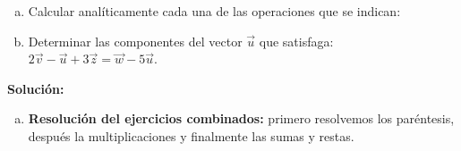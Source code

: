 \documentclass[11pt,a4paper]{article}
\begin{document}
\begin{enumerate}[\hspace{-5mm} 1) ]
    \begin{enumerate}[a)]
        \item Calcular analíticamente cada una de las operaciones que se indican:
            \begin{enumerate}[i)]
            \end{enumerate}
        \item Determinar las componentes del vector $\vec{u}$ que satisfaga: $2\vec{v} - \vec{u} + 3\vec{z} = \vec{w} - 5\vec{u}$.
    \end{enumerate} 

\bigskip

\textbf{Solución:}



\begin{enumerate}[a)]

\item \textbf{Resolución del ejercicios combinados:} primero resolvemos los paréntesis, después la multiplicaciones y finalmente las sumas y restas.



\end{enumerate}
\end{enumerate}
\end{document}
